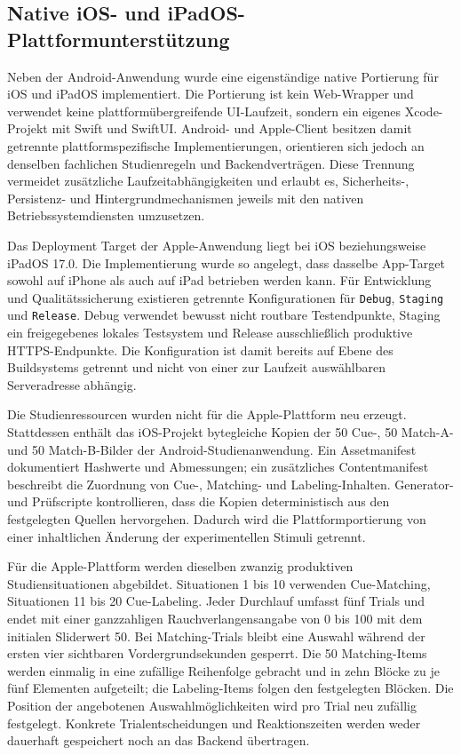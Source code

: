 
\begin{neu}
\section{Native iOS- und iPadOS-Plattformunterstützung}

Neben der Android-Anwendung wurde eine eigenständige native Portierung für iOS und iPadOS implementiert. Die Portierung ist kein Web-Wrapper und verwendet keine plattformübergreifende UI-Laufzeit, sondern ein eigenes Xcode-Projekt mit Swift und SwiftUI. Android- und Apple-Client besitzen damit getrennte plattformspezifische Implementierungen, orientieren sich jedoch an denselben fachlichen Studienregeln und Backendverträgen. Diese Trennung vermeidet zusätzliche Laufzeitabhängigkeiten und erlaubt es, Sicherheits-, Persistenz- und Hintergrundmechanismen jeweils mit den nativen Betriebssystemdiensten umzusetzen.

Das Deployment Target der Apple-Anwendung liegt bei iOS beziehungsweise iPadOS 17.0. Die Implementierung wurde so angelegt, dass dasselbe App-Target sowohl auf iPhone als auch auf iPad betrieben werden kann. Für Entwicklung und Qualitätssicherung existieren getrennte Konfigurationen für \texttt{Debug}, \texttt{Staging} und \texttt{Release}. Debug verwendet bewusst nicht routbare Testendpunkte, Staging ein freigegebenes lokales Testsystem und Release ausschließlich produktive HTTPS-Endpunkte. Die Konfiguration ist damit bereits auf Ebene des Buildsystems getrennt und nicht von einer zur Laufzeit auswählbaren Serveradresse abhängig.

Die Studienressourcen wurden nicht für die Apple-Plattform neu erzeugt. Stattdessen enthält das iOS-Projekt bytegleiche Kopien der 50 Cue-, 50 Match-A- und 50 Match-B-Bilder der Android-Studienanwendung. Ein Assetmanifest dokumentiert Hashwerte und Abmessungen; ein zusätzliches Contentmanifest beschreibt die Zuordnung von Cue-, Matching- und Labeling-Inhalten. Generator- und Prüfscripte kontrollieren, dass die Kopien deterministisch aus den festgelegten Quellen hervorgehen. Dadurch wird die Plattformportierung von einer inhaltlichen Änderung der experimentellen Stimuli getrennt.

Für die Apple-Plattform werden dieselben zwanzig produktiven Studiensituationen abgebildet. Situationen 1 bis 10 verwenden Cue-Matching, Situationen 11 bis 20 Cue-Labeling. Jeder Durchlauf umfasst fünf Trials und endet mit einer ganzzahligen Rauchverlangensangabe von 0 bis 100 mit dem initialen Sliderwert 50. Bei Matching-Trials bleibt eine Auswahl während der ersten vier sichtbaren Vordergrundsekunden gesperrt. Die 50 Matching-Items werden einmalig in eine zufällige Reihenfolge gebracht und in zehn Blöcke zu je fünf Elementen aufgeteilt; die Labeling-Items folgen den festgelegten Blöcken. Die Position der angebotenen Auswahlmöglichkeiten wird pro Trial neu zufällig festgelegt. Konkrete Trialentscheidungen und Reaktionszeiten werden weder dauerhaft gespeichert noch an das Backend übertragen.


\end{neu}
